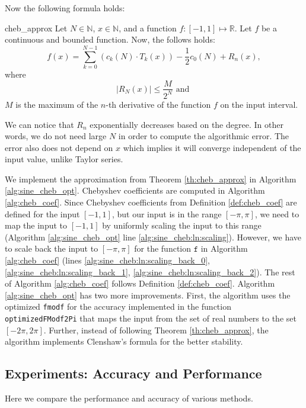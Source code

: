 \documentclass[12pt]{article}
\begin{document}
Now the following formula holds:
\begin{TheoremColor}{
}{cheb_approx}
    Let $N \in \mathbb{N}$, $x \in \mathbb{N}$, and a function $f : [-1, 1] \mapsto \mathbb{R}$.
    Let $f$ be a continuous and bounded function. Now, the follows holds:
    \begin{equation*}
        f(x) = \sum_{k=0}^{N-1} \left(c_k(N) \cdot T_k(x)\right) - \frac{1}{2} c_0(N) + R_n(x),
    \end{equation*}
    where
    \begin{equation*}
        \left| R_N(x) \right| \leq \frac{M}{2^N} \text{ and }
    \end{equation*}
    $M$ is the maximum of the $n$-th derivative of the function $f$ on the input interval.
\end{TheoremColor}
We can notice that $R_n$ exponentially decreases based on the degree.
In other words, we do not need large $N$ in order to compute the algorithmic error.
The error also does not depend on $x$ which implies it will converge independent of the input value, unlike Taylor series.

We implement the approximation from Theorem \ref{th:cheb_approx} in Algorithm \ref{alg:sine_cheb_opt}.
Chebyshev coefficients are computed in Algorithm \ref{alg:cheb_coef}.
Since Chebyshev coefficients from Definition \ref{def:cheb_coef} are defined for the input $[-1, 1]$, but our input is in the range $[-\pi, \pi]$, we need to map the input to $[-1, 1]$ by uniformly scaling the input to this range (Algorithm \ref{alg:sine_cheb_opt} line \ref{alg:sine_cheb:ln:scaling}).
However, we have to scale back the input to $[-\pi, \pi]$ for the function $\texttt{f}$ in Algorithm \ref{alg:cheb_coef} (lines \ref{alg:sine_cheb:ln:scaling_back_0}, \ref{alg:sine_cheb:ln:scaling_back_1}, \ref{alg:sine_cheb:ln:scaling_back_2}).
The rest of Algorithm \ref{alg:cheb_coef} follows Definition \ref{def:cheb_coef}.
Algorithm \ref{alg:sine_cheb_opt} has two more improvements.
First, the algorithm uses the optimized \texttt{fmodf} for the accuracy implemented in the function \texttt{optimizedFModf2Pi} that maps the input from the set of real numbers to the set $[-2 \pi, 2 \pi]$.
Further, instead of following Theorem \ref{th:cheb_approx}, the algorithm implements Clenshaw's formula \cite[p~.237]{press2007numerical} for the better stability.


\newpage
\subsection{Experiments: Accuracy and Performance}
Here we compare the performance and accuracy of various methods.
\end{document}
